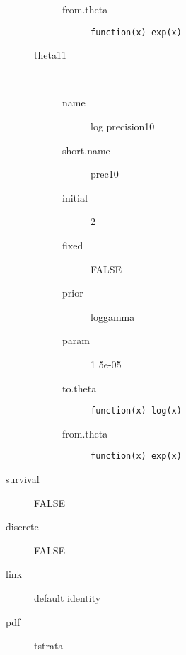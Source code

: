\begin{description}
\begin{description}
\begin{description}
	 	 	 \item[ from.theta ] \verb|function(x) exp(x) | 
	 	 \end{description}
	 	\item[theta11]\ 
	 	 \begin{description}
	 	 	 \item[ name ] log precision10 
	 	 	 \item[ short.name ] prec10 
	 	 	 \item[ initial ] 2 
	 	 	 \item[ fixed ] FALSE 
	 	 	 \item[ prior ] loggamma 
	 	 	 \item[ param ] 1 5e-05 
	 	 	 \item[ to.theta ] \verb|function(x) log(x)| 
	 	 	 \item[ from.theta ] \verb|function(x) exp(x) | 
	 	 \end{description}
	 \end{description}
	 \item[ survival ] FALSE 
	 \item[ discrete ] FALSE 
	 \item[ link ] default identity 
	 \item[ pdf ] tstrata 
\end{description}
